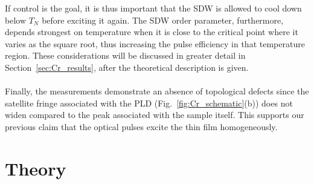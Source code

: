 If control is the goal, it is thus important that the SDW is allowed to cool down below $T_N$ before exciting it again.
The SDW order parameter, furthermore, depends strongest on temperature when it is close to the critical point where it varies as the square root, thus increasing the pulse efficiency in that temperature region.
These considerations will be discussed in greater detail in Section~\ref{sec:Cr_results}, after the theoretical description is given.
\\\\
Finally, the measurements demonstrate an absence of topological defects since the satellite fringe associated with the PLD (Fig.~\ref{fig:Cr_schematic}(b)) does not widen compared to the peak associated with the sample itself.
This supports our previous claim that the optical pulses excite the thin film homogeneously. 
\section{Theory}



